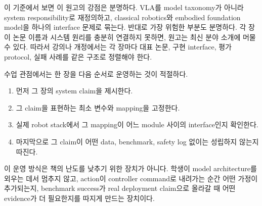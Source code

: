 이 기준에서 보면 이 원고의 강점은 분명하다. VLA를 model taxonomy가 아니라 system responsibility로 재정의하고, classical robotics와 embodied foundation model을 하나의 interface 문제로 묶는다. 반대로 가장 위험한 부분도 분명하다. 각 장이 논문 이름과 시스템 원리를 충분히 연결하지 못하면, 원고는 최신 분야 소개에 머물 수 있다. 따라서 강의나 개정에서는 각 장마다 대표 논문, 구현 interface, 평가 protocol, 실패 사례를 같은 구조로 정렬해야 한다.

수업 관점에서는 한 장을 다음 순서로 운영하는 것이 적절하다.

\begin{enumerate}
  \item 먼저 그 장의 system claim을 제시한다.
  \item 그 claim을 표현하는 최소 변수와 mapping을 고정한다.
  \item 실제 robot stack에서 그 mapping이 어느 module 사이의 interface인지 확인한다.
  \item 마지막으로 그 claim이 어떤 data, benchmark, safety log 없이는 성립하지 않는지 따진다.
\end{enumerate}

이 운영 방식은 책의 난도를 낮추기 위한 장치가 아니다. 학생이 model architecture를 외우는 데서 멈추지 않고, action이 controller command로 내려가는 순간 어떤 가정이 추가되는지, benchmark success가 real deployment claim으로 올라갈 때 어떤 evidence가 더 필요한지를 따지게 만드는 장치이다.
